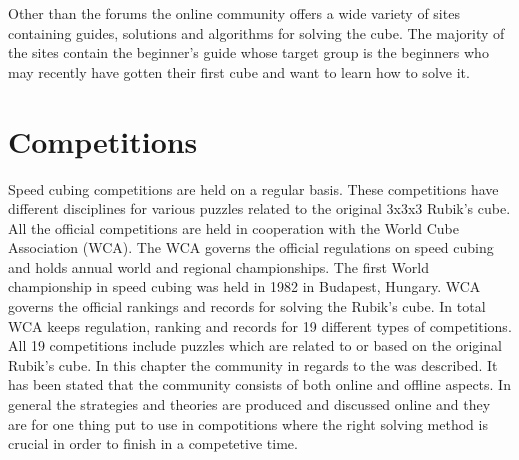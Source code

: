 Other than the forums the online community offers a wide variety of sites containing guides, solutions and algorithms for solving the cube. The majority of the \rubik{} sites contain the beginner's guide\cite{jasminLee08} whose target group is the beginners who may recently have gotten their first cube and want to learn how to solve it. 

\section{Competitions}
\label{sec:wca}
Speed cubing competitions are held on a regular basis\cite{wca/competitions}. These competitions have different disciplines for various puzzles related to the original 3x3x3 Rubik's cube. All the official competitions are held in cooperation with the World Cube Association (WCA). The WCA governs the official regulations on speed cubing and holds annual world and regional championships. The first World championship in speed cubing was held in 1982 in Budapest, Hungary. WCA governs the official rankings and records for solving the Rubik's cube. In total WCA keeps regulation, ranking and records for 19 different types of competitions. All 19 competitions include puzzles which are related to or based on the original Rubik's cube. 
\startTail{}
In this chapter the community in regards to the \rubik{} was described. It has been stated that the community consists of both online and offline aspects. In general the strategies and theories are produced and discussed online and they are for one thing put to use in compotitions where the right solving method is crucial in order to finish in a competetive time.
\stopTail{}
%